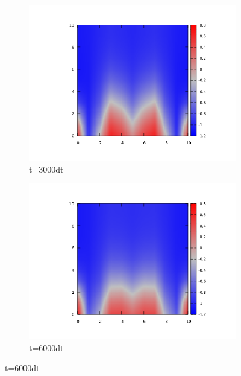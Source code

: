 \documentclass{article}
\begin{document}
\begin{figure}
\centering
\begin{subfigure}{.5\textwidth}
  \centering
  \includegraphics[width=1.0\linewidth]{3000contact.png}
  \caption{t=3000dt}
  \label{fig:sub1}
\end{subfigure}%
\begin{subfigure}{.5\textwidth}
  \centering
  \includegraphics[width=1.0\linewidth]{6000contact.png}
  \caption{t=6000dt}
  \label{fig:sub2}
\end{subfigure}
\label{fig:test}
\end{figure}
\vfill
\end{document}
